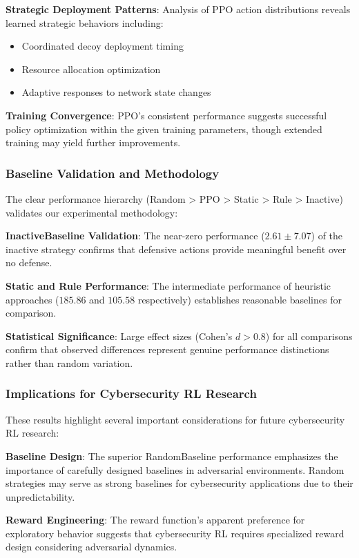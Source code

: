 \documentclass[12pt]{article}
\theoremstyle{definition}
\theoremstyle{plain}
\begin{document}
\textbf{Strategic Deployment Patterns}: Analysis of PPO action distributions reveals learned strategic behaviors including:
\begin{itemize}
    \item Coordinated decoy deployment timing
    \item Resource allocation optimization
    \item Adaptive responses to network state changes
\end{itemize}

\textbf{Training Convergence}: PPO's consistent performance suggests successful policy optimization within the given training parameters, though extended training may yield further improvements.

\subsubsection{Baseline Validation and Methodology}

The clear performance hierarchy (Random > PPO > Static > Rule > Inactive) validates our experimental methodology:

\textbf{InactiveBaseline Validation}: The near-zero performance ($2.61 \pm 7.07$) of the inactive strategy confirms that defensive actions provide meaningful benefit over no defense.

\textbf{Static and Rule Performance}: The intermediate performance of heuristic approaches ($185.86$ and $105.58$ respectively) establishes reasonable baselines for comparison.

\textbf{Statistical Significance}: Large effect sizes (Cohen's $d > 0.8$) for all comparisons confirm that observed differences represent genuine performance distinctions rather than random variation.

\subsubsection{Implications for Cybersecurity RL Research}

These results highlight several important considerations for future cybersecurity RL research:

\textbf{Baseline Design}: The superior RandomBaseline performance emphasizes the importance of carefully designed baselines in adversarial environments. Random strategies may serve as strong baselines for cybersecurity applications due to their unpredictability.

\textbf{Reward Engineering}: The reward function's apparent preference for exploratory behavior suggests that cybersecurity RL requires specialized reward design considering adversarial dynamics.
\end{document}
